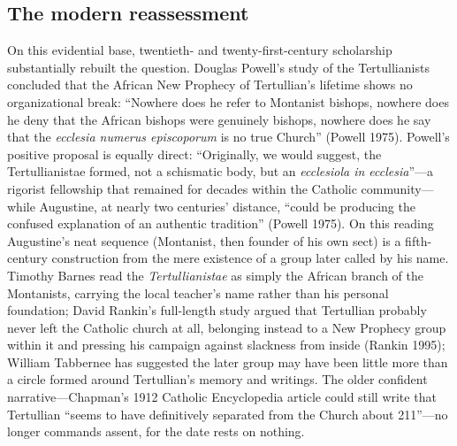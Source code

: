 \subsection{The modern reassessment}

On this evidential base, twentieth- and twenty-first-century scholarship
substantially rebuilt the question. Douglas Powell's study of the
Tertullianists concluded that the African New Prophecy of Tertullian's lifetime
shows no organizational break: ``Nowhere does he refer to Montanist bishops,
nowhere does he deny that the African bishops were genuinely bishops, nowhere
does he say that the \textit{ecclesia numerus episcoporum} is no true Church''
(Powell 1975). Powell's positive proposal is equally direct: ``Originally, we
would suggest, the Tertullianistae formed, not a schismatic body, but an
\textit{ecclesiola in ecclesia}''---a rigorist fellowship that remained for
decades within the Catholic community---while Augustine, at nearly two
centuries' distance, ``could be producing the confused explanation of an
authentic tradition'' (Powell 1975). On this reading Augustine's neat sequence
(Montanist, then founder of his own sect) is a fifth-century construction from
the mere existence of a group later called by his name. Timothy Barnes read the
\textit{Tertullianistae} as simply the African branch of the Montanists,
carrying the local teacher's name rather than his personal foundation; David
Rankin's full-length study argued that Tertullian probably never left the
Catholic church at all, belonging instead to a New Prophecy group within it and
pressing his campaign against slackness from inside (Rankin 1995); William Tabbernee has suggested the later group may have been
little more than a circle formed around Tertullian's memory and writings. The
older confident narrative---Chapman's 1912 Catholic Encyclopedia article could
still write that Tertullian ``seems to have definitively separated from the
Church about 211''---no longer commands assent, for the date rests on nothing.

